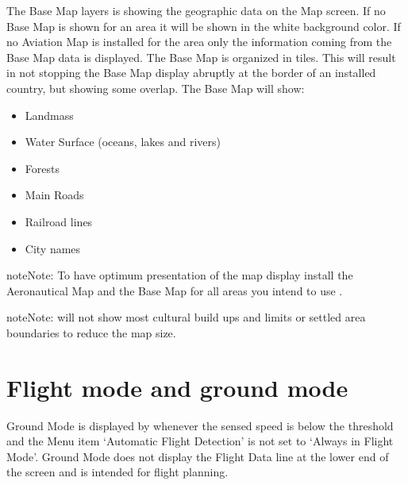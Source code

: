 \documentclass[letterpaper,10pt,english]{sphinxmanual}
\begin{document}
\sphinxAtStartPar
{}

\sphinxAtStartPar
The Base Map layers is showing the geographic data on the Map screen. If no Base Map is shown for an area it will be shown in the white background color. If no Aviation Map is installed for the area only the information coming from the Base Map data is displayed. The Base Map is organized in tiles. This will result in not stopping the Base Map display abruptly at the border of an installed country, but showing some overlap.
The Base Map will show:
\begin{itemize}
\item {} 
\sphinxAtStartPar
Landmass

\item {} 
\sphinxAtStartPar
Water Surface (oceans, lakes and rivers)

\item {} 
\sphinxAtStartPar
Forests

\item {} 
\sphinxAtStartPar
Main Roads

\item {} 
\sphinxAtStartPar
Railroad lines

\item {} 
\sphinxAtStartPar
City names

\end{itemize}

\begin{sphinxadmonition}{note}{Note:}
\sphinxAtStartPar
To have optimum presentation of the  map
display install the Aeronautical Map and the Base Map for all areas you
intend to use .
\end{sphinxadmonition}

\begin{sphinxadmonition}{note}{Note:}
\sphinxAtStartPar
{} will not show most cultural build ups
and limits or settled area boundaries to reduce the map size.
\end{sphinxadmonition}


\section{Flight mode and ground mode}
\label{\detokenize{01-intro/getting_started:flight-mode-and-ground-mode}}
\sphinxAtStartPar
{}

\sphinxAtStartPar
Ground Mode is displayed by  whenever the sensed
speed is below the threshold and the Menu item ‘Automatic Flight Detection’ is
not set to ‘Always in Flight Mode’.  Ground Mode does not display the Flight
Data line at the lower end of the screen and is intended for flight planning.
\end{document}
